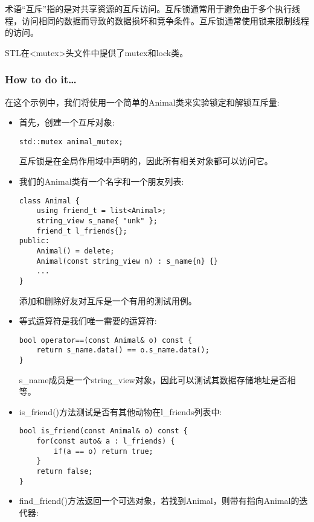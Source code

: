 
术语“互斥”指的是对共享资源的互斥访问。互斥锁通常用于避免由于多个执行线程，访问相同的数据而导致的数据损坏和竞争条件。互斥锁通常使用锁来限制线程的访问。

STL在<mutex>头文件中提供了mutex和lock类。


\subsubsection{How to do it…}

在这个示例中，我们将使用一个简单的Animal类来实验锁定和解锁互斥量:

\begin{itemize}
\item 
首先，创建一个互斥对象:

\begin{lstlisting}[style=styleCXX]
std::mutex animal_mutex;
\end{lstlisting}

互斥锁是在全局作用域中声明的，因此所有相关对象都可以访问它。

\item 
我们的Animal类有一个名字和一个朋友列表:

\begin{lstlisting}[style=styleCXX]
class Animal {
	using friend_t = list<Animal>;
	string_view s_name{ "unk" };
	friend_t l_friends{};
public:
	Animal() = delete;
	Animal(const string_view n) : s_name{n} {}
	...
}
\end{lstlisting}

添加和删除好友对互斥是一个有用的测试用例。

\item 
等式运算符是我们唯一需要的运算符:

\begin{lstlisting}[style=styleCXX]
bool operator==(const Animal& o) const {
	return s_name.data() == o.s_name.data();
}
\end{lstlisting}

s\_name成员是一个string\_view对象，因此可以测试其数据存储地址是否相等。

\item 
is\_friend()方法测试是否有其他动物在l\_friends列表中:

\begin{lstlisting}[style=styleCXX]
bool is_friend(const Animal& o) const {
	for(const auto& a : l_friends) {
		if(a == o) return true;
	}
	return false;
}
\end{lstlisting}

\item 
find\_friend()方法返回一个可选对象，若找到Animal，则带有指向Animal的迭代器:


\end{itemize}
